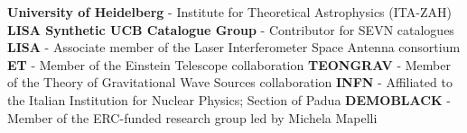%
%
%


\begin{singlelines}
					{\textbf{University of Heidelberg} - Institute for Theoretical Astrophysics (ITA-ZAH)}{}
					{\textbf{LISA Synthetic UCB Catalogue Group} - Contributor for SEVN catalogues}{}
					{\textbf{LISA} - Associate member of the Laser Interferometer Space Antenna consortium}	{}
					{\textbf{ET} - Member of the Einstein Telescope collaboration}{}
					{\textbf{TEONGRAV} - Member of the Theory of Gravitational Wave Sources collaboration}{}
					{\textbf{INFN}	- Affiliated to the Italian Institution for Nuclear Physics; Section of Padua}{}
					{\textbf{DEMOBLACK} - Member of the ERC-funded research group led by Michela Mapelli }{}
\end{singlelines}
\medskip